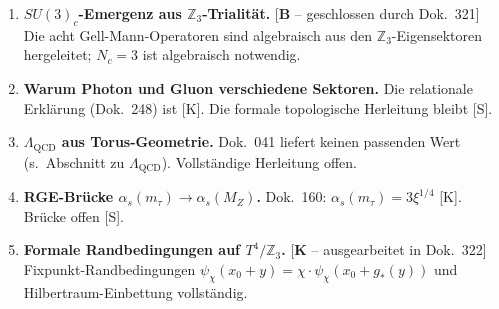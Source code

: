 \begin{enumerate}
  \item \textbf{$SU(3)_c$-Emergenz aus $\mathbb{Z}_3$-Trialität.}
    [\textbf{B} -- geschlossen durch Dok.~321] Die acht Gell-Mann-Operatoren
    sind algebraisch aus den $\mathbb{Z}_3$-Eigensektoren hergeleitet;
    $N_c=3$ ist algebraisch notwendig.
  \item \textbf{Warum Photon und Gluon verschiedene Sektoren.}
    Die relationale Erklärung (Dok.~248) ist [K]. Die formale
    topologische Herleitung bleibt [S].
  \item \textbf{$\Lambda_\text{QCD}$ aus Torus-Geometrie.}
    Dok.~041 liefert keinen passenden Wert (s.\ Abschnitt zu $\Lambda_\text{QCD}$). Vollständige Herleitung offen.
  \item \textbf{RGE-Brücke $\alpha_s(m_\tau)\to\alpha_s(M_Z)$.}
    Dok.~160: $\alpha_s(m_\tau)=3\xi^{1/4}$ [K]. Brücke offen [S].
  \item \textbf{Formale Randbedingungen auf $T^4/\mathbb{Z}_3$.}
    [\textbf{K} -- ausgearbeitet in Dok.~322] Fixpunkt-Randbedingungen
    $\psi_\chi(x_0+y) = \chi\cdot\psi_\chi(x_0+g_*(y))$ und
    Hilbertraum-Einbettung vollständig.
\end{enumerate}
